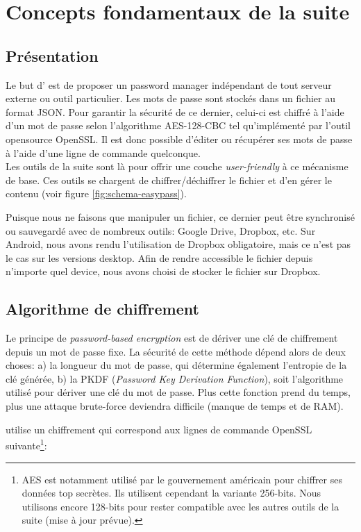 
\section{Concepts fondamentaux de la suite \easypass{}}

\subsection{Présentation}
Le but d'\easypass{} est de proposer un password manager indépendant de tout serveur externe ou outil particulier. Les mots de passe sont stockés dans un fichier au format JSON. Pour garantir la sécurité de ce dernier, celui-ci est chiffré à l'aide d'un mot de passe selon l'algorithme AES-128-CBC tel qu'implémenté par l'outil opensource OpenSSL. Il est donc possible d'éditer ou récupérer ses mots de passe à l'aide d'une ligne de commande quelconque. \\
Les outils de la suite \easypass{} sont là pour offrir une couche \emph{user-friendly} à ce mécanisme de base. Ces outils se chargent de chiffrer/déchiffrer le fichier et d'en gérer le contenu (voir figure \ref{fig:schema-easypass}). 

Puisque nous ne faisons que manipuler un fichier, ce dernier peut être synchronisé ou sauvegardé avec de nombreux outils: Google Drive, Dropbox, etc. Sur Android, nous avons rendu l'utilisation de Dropbox obligatoire, mais ce n'est pas le cas sur les versions desktop.
Afin de rendre accessible le fichier depuis n'importe quel device, nous avons choisi de stocker le fichier sur Dropbox. 


\subsection{Algorithme de chiffrement}

Le principe de \emph{password-based encryption} est de dériver une clé de chiffrement depuis un mot de passe fixe. La sécurité de cette méthode dépend alors de deux choses: a) la longueur du mot de passe, qui détermine également l'entropie de la clé générée, b) la PKDF (\emph{Password Key Derivation Function}), soit l'algorithme utilisé pour dériver une clé du mot de passe. Plus cette fonction prend du temps, plus une attaque brute-force deviendra difficile (manque de temps et de RAM).

\easypass{} utilise un chiffrement qui correspond aux lignes de commande OpenSSL suivante\footnote{AES est notamment utilisé par le gouvernement américain pour chiffrer ses données top secrètes. Ils utilisent cependant la variante 256-bits. Nous utilisons encore 128-bits pour rester compatible avec les autres outils de la suite (mise à jour prévue).}:

